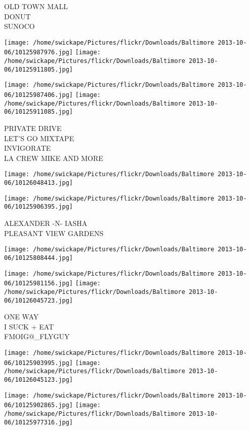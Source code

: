 \documentclass[10pt,letterpaper]{article}
\begin{document}
OLD TOWN MALL\\
DONUT\\
SUNOCO
\pagebreak

\texttt{[image: /home/swickape/Pictures/flickr/Downloads/Baltimore 2013-10-06/10125987976.jpg]}
\texttt{[image: /home/swickape/Pictures/flickr/Downloads/Baltimore 2013-10-06/10125911805.jpg]}

\texttt{[image: /home/swickape/Pictures/flickr/Downloads/Baltimore 2013-10-06/10125987406.jpg]}
\texttt{[image: /home/swickape/Pictures/flickr/Downloads/Baltimore 2013-10-06/10125911085.jpg]}

PRIVATE DRIVE\\
LET'S GO MIXTAPE\\
INVIGORATE\\
LA CREW MIKE AND MORE
\pagebreak

\texttt{[image: /home/swickape/Pictures/flickr/Downloads/Baltimore 2013-10-06/10126048413.jpg]}

\vspace{0.25in}
\texttt{[image: /home/swickape/Pictures/flickr/Downloads/Baltimore 2013-10-06/10125906395.jpg]}

ALEXANDER {-}N{-} IASHA\\
PLEASANT VIEW GARDENS
\pagebreak

\texttt{[image: /home/swickape/Pictures/flickr/Downloads/Baltimore 2013-10-06/10125808444.jpg]}

\vspace{0.25in}
\texttt{[image: /home/swickape/Pictures/flickr/Downloads/Baltimore 2013-10-06/10125981156.jpg]}
\texttt{[image: /home/swickape/Pictures/flickr/Downloads/Baltimore 2013-10-06/10126045723.jpg]}

ONE WAY\\
I SUCK + EAT\\
FMOIG@\_FLYGUY
\pagebreak

\texttt{[image: /home/swickape/Pictures/flickr/Downloads/Baltimore 2013-10-06/10125903995.jpg]}
\texttt{[image: /home/swickape/Pictures/flickr/Downloads/Baltimore 2013-10-06/10126045123.jpg]}

\texttt{[image: /home/swickape/Pictures/flickr/Downloads/Baltimore 2013-10-06/10125902865.jpg]}
\texttt{[image: /home/swickape/Pictures/flickr/Downloads/Baltimore 2013-10-06/10125977316.jpg]}
\end{document}
